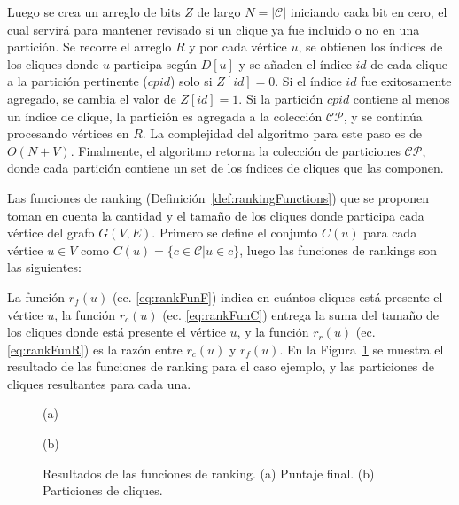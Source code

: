 Luego se crea un arreglo de bits $Z$ de largo $N = |\mathcal{C}|$ iniciando cada bit en cero, el cual servirá para mantener revisado si un clique ya fue incluido o no en una partición. Se recorre el arreglo $R$ y por cada vértice $u$, se obtienen los índices de los cliques donde $u$ participa según $D[u]$ y se añaden el índice $id$ de cada clique a la partición pertinente ($cpid$) solo si $Z[id] = 0$. Si el índice $id$ fue exitosamente agregado, se cambia el valor de $Z[id] = 1$. Si la partición $cpid$ contiene al menos un índice de clique, la partición es agregada a la colección $\mathcal{C}\mathcal{P}$, y se continúa procesando vértices en $R$. La complejidad del algoritmo para este paso es de $O(N+V)$. Finalmente, el algoritmo retorna la colección de particiones $\mathcal{C}\mathcal{P}$, donde cada partición contiene un set de los índices de cliques que las componen.



Las funciones de ranking (Definición~\ref{def:rankingFunctions}) que se proponen toman en cuenta la cantidad y el tamaño de los cliques donde participa cada vértice del grafo $G(V, E)$. Primero se define el conjunto $C(u)$ para cada vértice $u \in V$ como $C(u) = \{c \in \mathcal{C}|u \in c\}$, luego las funciones de rankings son las siguientes:



La función $r_{f}(u)$ (ec. \ref{eq:rankFunF}) indica en cuántos cliques está presente el vértice $u$, la función $r_{c}(u)$ (ec. \ref{eq:rankFunC}) entrega la suma del tamaño de los cliques donde está presente el vértice $u$, y la función $r_{r}(u)$ (ec. \ref{eq:rankFunR}) es la razón entre $r_{c}(u)$ y $r_{f}(u)$. En la Figura~\ref{fig:sequences} se muestra el resultado de las funciones de ranking para el caso ejemplo, y las particiones de cliques resultantes para cada una.

\begin{figure}
    \centering

    \begin{minipage}{\textwidth}
    	\centering
    	
    	
    	(a)
    \end{minipage}

    \hfill\vline\hfill
    
    \begin{minipage}{\textwidth}
    	\centering
    	
    	
    	(b)
    \end{minipage}
    
    \caption{Resultados de las funciones de ranking. (a) Puntaje final. (b) Particiones de cliques.}
    \label{fig:sequences}
\end{figure}


